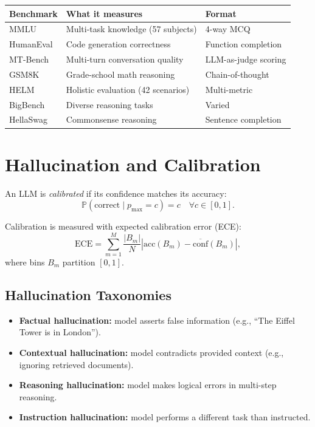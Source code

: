 \documentclass[11pt,a4paper]{book}
\theoremstyle{definition}
\begin{document}
\begin{longtable}{p{3.5cm}p{5cm}p{5cm}}
	\toprule
	\textbf{Benchmark} & \textbf{What it measures}          & \textbf{Format}      \\
	\midrule
	MMLU               & Multi-task knowledge (57 subjects) & 4-way MCQ            \\
	HumanEval          & Code generation correctness        & Function completion  \\
	MT-Bench           & Multi-turn conversation quality    & LLM-as-judge scoring \\
	GSM8K              & Grade-school math reasoning        & Chain-of-thought     \\
	HELM               & Holistic evaluation (42 scenarios) & Multi-metric         \\
	BigBench           & Diverse reasoning tasks            & Varied               \\
	HellaSwag          & Commonsense reasoning              & Sentence completion  \\
	\bottomrule
\end{longtable}

\section{Hallucination and Calibration}

An LLM is \emph{calibrated} if its confidence matches its accuracy:
\begin{equation}
	\mathbb{P}(\text{correct} \mid p_{\text{max}} = c) = c \quad \forall c \in [0,1].
\end{equation}

Calibration is measured with expected calibration error (ECE):
\begin{equation}
	\text{ECE} = \sum_{m=1}^{M} \frac{|B_m|}{N} \left|\text{acc}(B_m) - \overline{\text{conf}}(B_m)\right|,
\end{equation}
where bins $B_m$ partition $[0,1]$.

\subsection{Hallucination Taxonomies}

\begin{itemize}
	\item \textbf{Factual hallucination:} model asserts false information (e.g., ``The Eiffel Tower is in London'').
	\item \textbf{Contextual hallucination:} model contradicts provided context (e.g., ignoring retrieved documents).
	\item \textbf{Reasoning hallucination:} model makes logical errors in multi-step reasoning.
	\item \textbf{Instruction hallucination:} model performs a different task than instructed.
\end{itemize}
\end{document}
